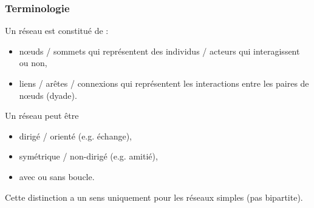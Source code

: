 \documentclass[nopagenumber,9pt]{beamer}
\begin{document}
\begin{frame}
 \frametitle{Terminologie}
 
 Un réseau est constitué de :
 \begin{itemize}
  \item n\oe uds / sommets qui représentent des individus / acteurs qui interagissent ou non,
  \item liens / ar\^etes / connexions qui représentent les interactions entre les paires de n\oe uds (dyade).
  
 \end{itemize}

\bigskip
 
Un réseau peut \^etre 
\begin{itemize}
  \item dirigé / orienté (e.g. échange),
  \item symétrique / non-dirigé (e.g. amitié),
  \item avec ou sans boucle.
 \end{itemize}

 Cette distinction a un sens uniquement pour les réseaux simples (pas bipartite).
 
 
\end{frame}
\end{document}
